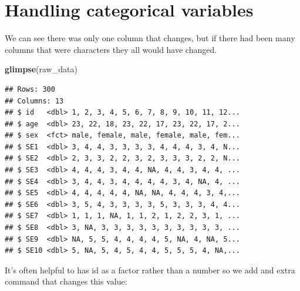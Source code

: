 \documentclass[
]{krantz}
\makeatletter
\newenvironment{Shaded}{\begin{snugshade}}{\end{snugshade}}
\newcommand{\CommentTok}[1]{\textcolor[rgb]{0.37,0.37,0.37}{\textit{#1}}}
\newcommand{\DataTypeTok}[1]{\textcolor[rgb]{0.27,0.27,0.27}{#1}}
\newcommand{\KeywordTok}[1]{\textcolor[rgb]{0.27,0.27,0.27}{\textbf{#1}}}
\newcommand{\NormalTok}[1]{#1}
\newcommand{\OperatorTok}[1]{\textcolor[rgb]{0.43,0.43,0.43}{\textbf{#1}}}
\newcommand{\StringTok}[1]{\textcolor[rgb]{0.5,0.5,0.5}{#1}}
\newenvironment{kframe}{%
\medskip{}
\setlength{\fboxsep}{.8em}
 \def\at@end@of@kframe{}%
 \ifinner\ifhmode%
  \def\at@end@of@kframe{\end{minipage}}%
  \begin{minipage}{\columnwidth}%
 \fi\fi%
 \def\FrameCommand##1{\hskip\@totalleftmargin \hskip-\fboxsep
 \colorbox{shadecolor}{##1}\hskip-\fboxsep
     \hskip-\linewidth \hskip-\@totalleftmargin \hskip\columnwidth}%
 \MakeFramed {\advance\hsize-\width
   \@totalleftmargin\z@ \linewidth\hsize
   \@setminipage}}%
 {\par\unskip\endMakeFramed%
 \at@end@of@kframe}
\renewenvironment{Shaded}{\begin{kframe}}{\end{kframe}}
\makeatother
\begin{document}
\hypertarget{handling-categorical-variables}{%
\section{Handling categorical variables}\label{handling-categorical-variables}}

\begin{Shaded}
\end{Shaded}

We can see there was only one column that changes, but if there had been many columns that were characters they all would have changed.

\begin{Shaded}
\begin{Highlighting}[]
\KeywordTok{glimpse}\NormalTok{(raw_data)}
\end{Highlighting}
\end{Shaded}

\begin{verbatim}
## Rows: 300
## Columns: 13
## $ id   <dbl> 1, 2, 3, 4, 5, 6, 7, 8, 9, 10, 11, 12...
## $ age  <dbl> 23, 22, 18, 23, 22, 17, 23, 22, 17, 2...
## $ sex  <fct> male, female, male, female, male, fem...
## $ SE1  <dbl> 3, 4, 4, 3, 3, 3, 3, 4, 4, 4, 3, 4, N...
## $ SE2  <dbl> 2, 3, 3, 2, 2, 3, 2, 3, 3, 3, 2, 2, N...
## $ SE3  <dbl> 4, 4, 4, 3, 4, 4, NA, 4, 4, 3, 4, 4, ...
## $ SE4  <dbl> 3, 4, 4, 3, 4, 4, 4, 4, 3, 4, NA, 4, ...
## $ SE5  <dbl> 4, 4, 4, 4, 4, NA, NA, 4, 4, 4, 3, 4,...
## $ SE6  <dbl> 3, 5, 4, 3, 3, 3, 3, 5, 3, 3, 3, 4, 4...
## $ SE7  <dbl> 1, 1, 1, NA, 1, 1, 2, 1, 2, 2, 3, 1, ...
## $ SE8  <dbl> 3, NA, 3, 3, 3, 3, 3, 3, 3, 3, 3, 3, ...
## $ SE9  <dbl> NA, 5, 5, 4, 4, 4, 4, 5, NA, 4, NA, 5...
## $ SE10 <dbl> 5, NA, 5, 4, 5, 4, 4, 5, 5, 5, 4, NA,...
\end{verbatim}

It's often helpful to has id as a factor rather than a number so we add and extra command that changes this value:

\begin{Shaded}
\end{Shaded}
\end{document}
